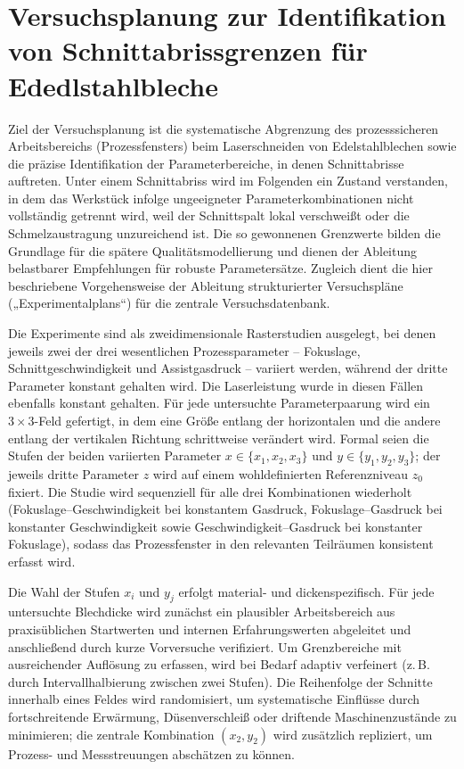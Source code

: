\chapter{Versuchsplanung zur Identifikation von Schnittabrissgrenzen für Ededlstahlbleche}
Ziel der Versuchsplanung ist die systematische Abgrenzung des prozesssicheren Arbeitsbereichs (Prozessfensters) beim Laserschneiden von Edelstahlblechen sowie die präzise Identifikation der Parameterbereiche, in denen Schnittabrisse auftreten. Unter einem Schnittabriss wird im Folgenden ein Zustand verstanden, in dem das Werkstück infolge ungeeigneter Parameterkombinationen nicht vollständig getrennt wird, weil der Schnittspalt lokal verschweißt oder die Schmelzaustragung unzureichend ist. Die so gewonnenen Grenzwerte bilden die Grundlage für die spätere Qualitätsmodellierung und dienen der Ableitung belastbarer Empfehlungen für robuste Parametersätze. Zugleich dient die hier beschriebene Vorgehensweise der Ableitung strukturierter Versuchspläne („Experimentalplans“) für die zentrale Versuchsdatenbank.

Die Experimente sind als zweidimensionale Rasterstudien ausgelegt, bei denen jeweils zwei der drei wesentlichen Prozessparameter – Fokuslage, Schnittgeschwindigkeit und Assistgasdruck – variiert werden, während der dritte Parameter konstant gehalten wird. Die Laserleistung wurde in diesen Fällen ebenfalls konstant gehalten. Für jede untersuchte Parameterpaarung wird ein $3\times 3$-Feld gefertigt, in dem eine Größe entlang der horizontalen und die andere entlang der vertikalen Richtung schrittweise verändert wird. Formal seien die Stufen der beiden variierten Parameter $x\in\{x_1,x_2,x_3\}$ und $y\in\{y_1,y_2,y_3\}$; der jeweils dritte Parameter $z$ wird auf einem wohldefinierten Referenzniveau $z_0$ fixiert. Die Studie wird sequenziell für alle drei Kombinationen wiederholt (Fokuslage–Geschwindigkeit bei konstantem Gasdruck, Fokuslage–Gasdruck bei konstanter Geschwindigkeit sowie Geschwindigkeit–Gasdruck bei konstanter Fokuslage), sodass das Prozessfenster in den relevanten Teilräumen konsistent erfasst wird.

Die Wahl der Stufen $x_i$ und $y_j$ erfolgt material- und dickenspezifisch. Für jede untersuchte Blechdicke wird zunächst ein plausibler Arbeitsbereich aus praxisüblichen Startwerten und internen Erfahrungswerten abgeleitet und anschließend durch kurze Vorversuche verifiziert. Um Grenzbereiche mit ausreichender Auflösung zu erfassen, wird bei Bedarf adaptiv verfeinert (z.\,B. durch Intervallhalbierung zwischen zwei Stufen). Die Reihenfolge der Schnitte innerhalb eines Feldes wird randomisiert, um systematische Einflüsse durch fortschreitende Erwärmung, Düsenverschleiß oder driftende Maschinenzustände zu minimieren; die zentrale Kombination $(x_2,y_2)$ wird zusätzlich repliziert, um Prozess- und Messstreuungen abschätzen zu können.


